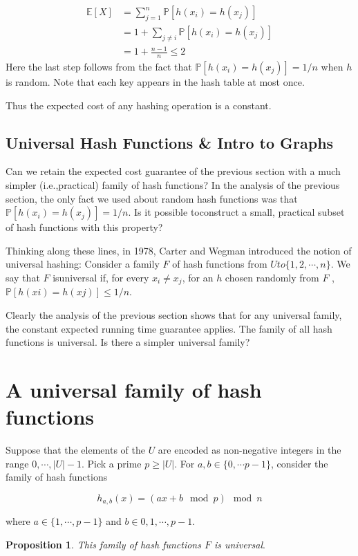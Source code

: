 \documentclass [12pt]{article}
\begin{document}
\begin{align*}
  \mathbb{E}[X] &= \sum_{j=1}^n \mathbb{P}[h(x_i) = h(x_j)] \\
  &= 1 + \sum_{j\neq i} \mathbb{P}[h(x_i) = h(x_j)] \tag{We are guaranteed to collide with ourselves} \\
  &= 1 + \frac{n-1}{n} \leq 2
\end{align*}
Here the last step follows from the fact that $\mathbb{P}[h(x_i ) = h(x_j )] = 1/n$ when $h$ is random. Note that each key appears in the hash table at most once.

Thus the expected cost of any hashing operation is a constant.

\subsection{Universal Hash Functions \& Intro to Graphs}
Can we retain the expected cost guarantee of the previous section with a much simpler (i.e.,practical) family of hash functions? In the analysis of the previous section, the only fact we used about random hash functions was that $\mathbb{P}[h(x_i ) = h(x_j )] = 1/n$. Is it possible toconstruct a small, practical subset of hash functions with this property?

Thinking along these lines, in 1978, Carter and Wegman introduced the notion of universal hashing: Consider a family $F$ of hash functions from $U to \{1, 2, \cdots , n\}$. We say that $F$ isuniversal if, for every $x_i \neq x_j$, for an $h$ chosen randomly from $F$ , $\mathbb{P}[h(xi ) = h(xj )] \leq 1/n$.

Clearly the analysis of the previous section shows that for any universal family, the constant expected running time guarantee applies. The family of all hash functions is universal. Is there a simpler universal family?

\section{A universal family of hash functions} 
Suppose that the elements of the $U$ are encoded as non-negative integers in the range ${0, \cdots, |U| - 1}$. Pick a prime $p \geq |U|$. For $a, b \in \{0, \cdots p - 1\}$, consider the family of hash functions 

$$
h_{a,b}(x) = (ax + b \mod p) \mod n
$$

where $a \in \{1, \cdots , p - 1\}$ and $b \in {0, 1, \cdots , p - 1}$. 

\textbf{Proposition 1}. \textit{This family of hash functions $F$ is universal}. 
\end{document}
